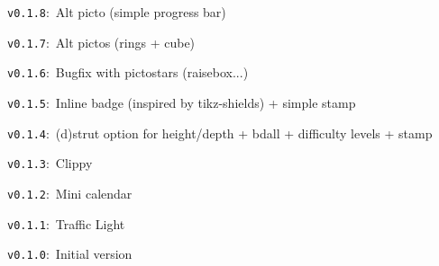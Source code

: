 \documentclass[english,10pt,a4paper]{article}
\begin{document}
\verb|v0.1.8|:~Alt picto (simple progress bar)

\verb|v0.1.7|:~Alt pictos (rings + cube)

\verb|v0.1.6|:~Bugfix with pictostars (raisebox...)

\verb|v0.1.5|:~Inline badge (inspired by \textsf{tikz-shields}) + simple stamp

\verb|v0.1.4|:~(d)strut option for height/depth + bdall + difficulty levels + stamp

\verb|v0.1.3|:~Clippy

\verb|v0.1.2|:~Mini calendar

\verb|v0.1.1|:~Traffic Light

\verb|v0.1.0|:~Initial version

\vspace*{1cm}\null
\end{document}
